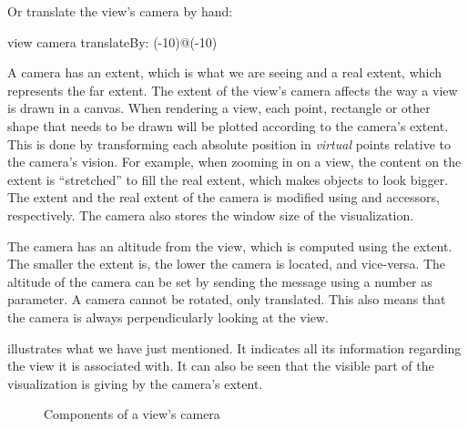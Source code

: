 \documentclass[a4paper,10pt,twoside]{book}
\begin{document}
Or translate the view's camera by hand:

\begin{code}{}
view camera translateBy: (-10)@(-10)
\end{code}

A camera has an extent, which is what we are seeing and a real extent, which represents the far extent. 
The extent of the view's camera affects the way a view is drawn in a canvas. When rendering a view, each point, rectangle or other shape that needs to be drawn will be plotted according to the camera's extent. This is done by transforming each absolute position in \emph{virtual} points relative to the camera's vision.
For example, when zooming in on a view, the content on the extent is ``stretched'' to fill the real extent, which makes objects to look bigger.
The extent and the real extent of the camera is modified using  and  accessors, respectively. The camera also stores the window size of the visualization.

The camera has an altitude from the view, which is computed using the extent. The smaller the extent is, the lower the camera is located, and vice-versa. The altitude of the camera can be set by sending the  message using a number as parameter.
A camera cannot be rotated, only translated. This also means that the camera is always perpendicularly looking at the view.

 illustrates what we have just mentioned. It indicates all its information regarding the view it is associated with. It can also be seen that the visible part of the visualization is giving by the camera's extent.


\begin{figure}[H]
        \centering
		 \hfill
		\hfill
        \caption{Components of a view's camera}\label{fig:cameraDiagram}
\end{figure}
\end{document}

